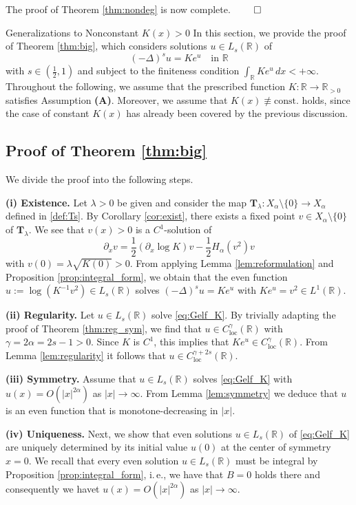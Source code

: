 \documentclass[reqno,10pt,a4paper]{amsart}
\makeatletter
\theoremstyle{definition}
\theoremstyle{definition}
\theoremstyle{remark}
\theoremstyle{remark}
\numberwithin{equation}{section}
\newcommand{\R}{\mathbb{R}}
\newcommand{\pt}{\partial}
\newcommand{\be}{\begin{equation}}
\newcommand{\ee}{\end{equation}}
\newcommand{\Ds}{(-\Delta)^{s}}
\newcommand{\Ts}{\mathbf{T}}
\newcommand{\Cloc}{C_{\mathrm{loc}}}
\def\section{\@startsection{section}{1}%
  \z@{1.5\linespacing\@plus\linespacing}{.5\linespacing}%
  {\normalfont\bfseries\large\centering}}
\makeatother
\begin{document}
The proof of Theorem \ref{thm:nondeg} is now complete. \hfill $\qed$

\section{Generalizations to Nonconstant $K(x) > 0$}
\label{sec:thm_big}
In this section, we provide the proof of Theorem \ref{thm:big}, which considers solutions $u \in L_s(\R)$ of 
\be \label{eq:Gelf_K}
\Ds u = K e^u \quad \mbox{in $\R$}
\ee
with $s \in (\frac 1 2,1)$ and subject to the finiteness condition $\int_\R K e^u \,dx < +\infty$. Throughout the following, we assume that the prescribed function $K : \R \to \R_{>0}$ satisfies Assumption \textbf{(A)}. Moreover, we assume that $K(x) \not \equiv \mbox{const}.$ holds, since the case of constant $K(x)$ has already been covered by the previous discussion.

\subsection{Proof of Theorem \ref{thm:big}} We divide the proof into the following steps.

\medskip
\textbf{(i) Existence.} Let $\lambda > 0$ be given and consider the map $\Ts_\lambda : X_\alpha \setminus \{ 0 \} \to X_\alpha$ defined in \eqref{def:Ts}. By Corollary \ref{cor:exist}, there exists a fixed point $v \in X_\alpha \setminus \{ 0 \}$ of $\Ts_\lambda$. We see that $v(x) > 0$ is a $C^1$-solution of 
$$
\pt_x v = \frac{1}{2} (\pt_x \log K) v -\frac{1}{2} H_\alpha(v^2) v
$$
with $v(0) = \lambda \sqrt{K(0)} >0$. From applying Lemma \ref{lem:reformulation} and Proposition \ref{prop:integral_form}, we obtain that the even function $u := \log(K^{-1} v^2) \in L_s(\R)$ solves $\Ds u = K e^u$ with $K e^u = v^2 \in L^1(\R)$.

\medskip
\textbf{(ii) Regularity.} Let $u \in L_s(\R)$ solve \eqref{eq:Gelf_K}. By trivially adapting the proof of Theorem \ref{thm:reg_sym}, we find that $u \in \Cloc^{\gamma}(\R)$ with $\gamma = 2 \alpha =2 s-1 > 0$. Since $K$ is $C^1$, this implies that $K e^u \in \Cloc^\gamma(\R)$. From Lemma \ref{lem:regularity} it follows that $u \in \Cloc^{\gamma + 2s}(\R)$. 

\medskip
\textbf{(iii) Symmetry.} Assume that $u \in L_s(\R)$ solves \eqref{eq:Gelf_K} with $u(x) = O(|x|^{2 \alpha})$ as $|x| \to \infty$. From Lemma \ref{lem:symmetry} we deduce that
$u$ is an even function that is monotone-decreasing in $|x|$.

\medskip
\textbf{(iv) Uniqueness.} Next, we show that even solutions $u \in L_s(\R)$ of \eqref{eq:Gelf_K} are uniquely determined by its initial value $u(0)$ at the center of symmetry $x=0$. We recall that every even solution $u \in L_s(\R)$ must be integral by Proposition \ref{prop:integral_form}, i.\,e., we have that $B=0$ holds there and consequently we havet $u(x) = O(|x|^{2 \alpha})$ as $|x| \to \infty$.
\end{document}
